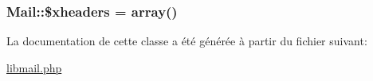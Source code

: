 \hypertarget{classMail_o4}{
\subsubsection[\$xheaders]{\setlength{\rightskip}{0pt plus 5cm}Mail::\$xheaders = array()}}
\label{classMail_o4}




La documentation de cette classe a \'{e}t\'{e} g\'{e}n\'{e}r\'{e}e \`{a} partir du fichier suivant:\begin{CompactItemize}
\item 
\hyperlink{libmail_8php}{libmail.php}\end{CompactItemize}
